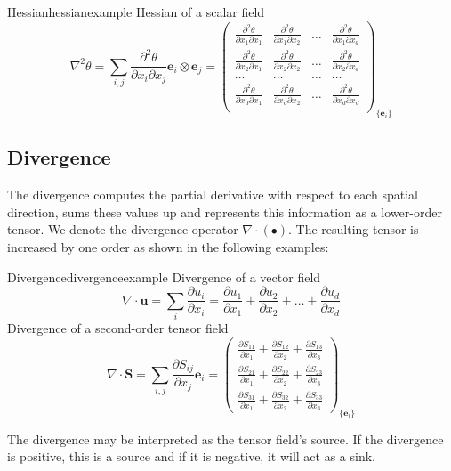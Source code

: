 \begin{example}{Hessian}{hessianexample}
    Hessian of a scalar field
    \begin{equation}
        \nabla^2 \theta = \sum_{i,j} \frac{\partial^2 \theta}{\partial x_i \partial x_j} \mathbf{e}_i \otimes \mathbf{e}_j
        = 
        \begin{pmatrix}
            \frac{\partial^2 \theta}{\partial x_1 \partial x_1} & \frac{\partial^2 \theta}{\partial x_1 \partial x_2} & \dots & \frac{\partial^2 \theta}{\partial x_1 \partial x_d}\\
            \frac{\partial^2 \theta}{\partial x_2 \partial x_1} & \frac{\partial^2 \theta}{\partial x_2 \partial x_2} & \dots & \frac{\partial^2 \theta}{\partial x_2 \partial x_d}\\
            \dots & \dots & \dots & \dots\\
            \frac{\partial^2 \theta}{\partial x_d \partial x_1} & \frac{\partial^2 \theta}{\partial x_d \partial x_2} & \dots & \frac{\partial^2 \theta}{\partial x_d \partial x_d}\\
        \end{pmatrix}_{\{\mathbf{e}_i\}}
    \end{equation}
\end{example}

\subsection{Divergence}
The divergence computes the partial derivative with respect to each spatial direction, sums these values up and represents this information as a lower-order tensor. We denote the divergence operator $\nabla \cdot (\bullet)$. The resulting tensor is increased by one order as shown in the following examples:
\begin{example}{Divergence}{divergenceexample}
    Divergence of a vector field
    \begin{equation}
        \nabla \cdot \mathbf{u} =  \sum_i \frac{\partial u_i}{\partial x_i}
        = 
        \frac{\partial u_1}{\partial x_1} + \frac{\partial u_2}{\partial x_2} + \dots + \frac{\partial u_d}{\partial x_d}
    \end{equation}
    Divergence of a second-order tensor field
    \begin{equation}
        \nabla \cdot \mathbf{S} = \sum_{i,j} \frac{\partial S_{ij}}{\partial x_j} \mathbf{e}_i
        = 
        \begin{pmatrix}
            \frac{\partial S_{11}}{\partial x_1} + \frac{\partial S_{12}}{\partial x_2} + \frac{\partial S_{13}}{\partial x_3} \\
            \frac{\partial S_{21}}{\partial x_1} + \frac{\partial S_{22}}{\partial x_2} + \frac{\partial S_{23}}{\partial x_3}\\
            \frac{\partial S_{31}}{\partial x_1} + \frac{\partial S_{32}}{\partial x_2} + \frac{\partial S_{33}}{\partial x_3}
        \end{pmatrix}_{\{\mathbf{e}_i\}}
    \end{equation}
\end{example}

The divergence may be interpreted as the tensor field's source. If the divergence is positive, this is a source and if it is negative, it will act as a sink. 


 

